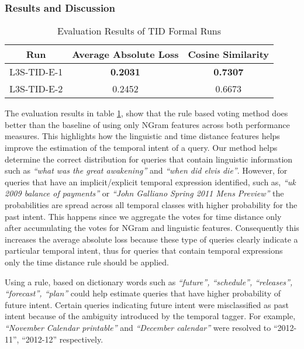 \documentclass{sig-alternate}
\begin{document}
\subsubsection{Results and Discussion}\label{sec:tid results}
\begin{table}[htbp]
\centering
\begin{tabular}{|c|c|c|}
\hline
Run & Average Absolute Loss & Cosine Similarity \\
\hline
\hline
L3S-TID-E-1 & \textbf{0.2031} & \textbf{0.7307} \\
\hline
L3S-TID-E-2 & 0.2452 & 0.6673 \\
\hline
\end{tabular}  
\caption{Evaluation Results of TID Formal Runs}
\label{table:1}
\end{table}
The evaluation results in \textsf{table \ref{table:1}}, show that the \textsf{rule based voting} method does better than the baseline of using only \textsf{NGram features} across both performance measures. This highlights how the \textsf{linguistic} and \textsf{time distance} features helps improve the estimation of the temporal intent of a query. Our method helps determine the correct distribution for queries that contain linguistic information such as \textit{``what was the great awakening''} and \textit{``when did elvis die''}. However, for queries that have an implicit/explicit temporal expression identified, such as, \textit{``uk 2009 balance of payments''} or \textit{``John Galliano Spring 2011 Mens Preview''} the probabilities are spread across all temporal classes with higher probability for the past intent. This happens since we aggregate the votes for time distance only after accumulating the votes for NGram and linguistic features. Consequently this increases the average absolute loss because these type of queries clearly indicate a particular temporal intent, thus for queries that contain temporal expressions only the time distance rule should be applied. 

Using a rule, based on dictionary words such as \textit{``future'', ``schedule'', ``releases'', ``forecast'', ``plan''} could help estimate queries that have higher probability of future intent. Certain queries indicating future intent were misclassified as past intent because of the ambiguity introduced by the temporal tagger. For example, \textit{``November Calendar printable''} and \textit{``December calendar''} were resolved to ``2012-11'', ``2012-12'' respectively. 
\end{document}
